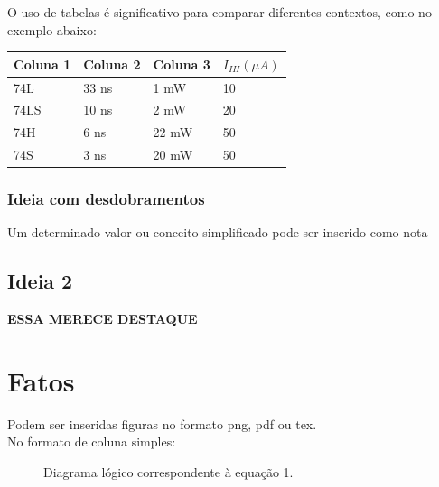 \documentclass[12pt,a4paper]{article} %
\begin{document}
O uso de tabelas é significativo para comparar diferentes contextos, como no exemplo abaixo: 

\par\vspace{\baselineskip} %

\begin{tabular}{|l||l|l|l|}
\hline
Coluna 1 & Coluna 2 & Coluna 3 & $I_{IH} (\mu A)$\\
\hline
74L & 33 ns & 1 mW & 10 \\
74LS & 10 ns & 2 mW & 20 \\
74H & 6 ns & 22 mW & 50 \\
74S & 3 ns & 20 mW & 50 \\
\hline
\end{tabular}

\par\vspace{\baselineskip}

\subsubsection{Ideia com desdobramentos}

Um determinado valor ou conceito simplificado pode ser inserido como nota \textrightarrow {}

\subsection{Ideia 2}

\begin{center}
\textbf{ESSA MERECE DESTAQUE} \\
\end{center}

\section{Fatos}
\par\vspace{\baselineskip}
Podem ser inseridas figuras no formato png, pdf ou tex. \\
No formato de coluna simples:
\par\vspace{\baselineskip}
\begin{figure}[htbp!]
    \center
    \caption{Diagrama lógico correspondente à equação 1.}
\end{figure}
\end{document}
